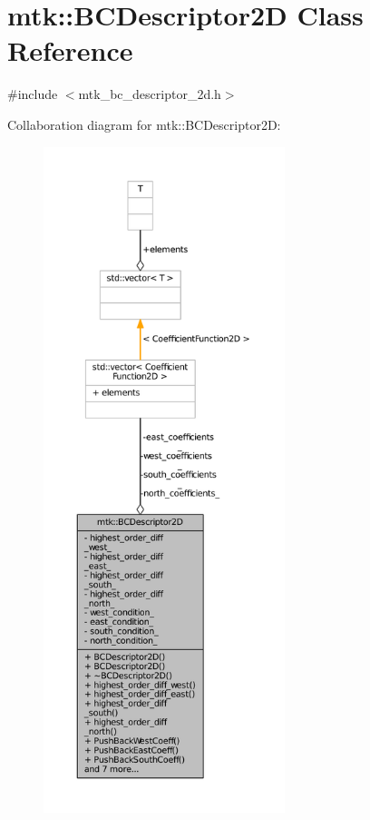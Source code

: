 \hypertarget{classmtk_1_1BCDescriptor2D}{\section{mtk\+:\+:B\+C\+Descriptor2\+D Class Reference}
\label{classmtk_1_1BCDescriptor2D}
}


{\ttfamily \#include $<$mtk\+\_\+bc\+\_\+descriptor\+\_\+2d.\+h$>$}



Collaboration diagram for mtk\+:\+:B\+C\+Descriptor2\+D\+:
\nopagebreak
\begin{figure}[H]
\begin{center}
\leavevmode
\includegraphics[height=550pt]{classmtk_1_1BCDescriptor2D__coll__graph}
\end{center}
\end{figure}
